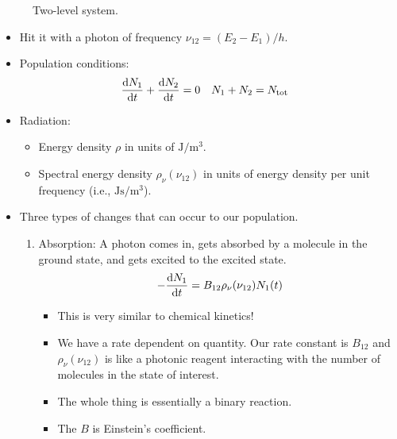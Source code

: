 \documentclass[../notes.tex]{subfiles}
\begin{document}
\begin{itemize}
\begin{figure}[h!]
        \caption{Two-level system.}
        \label{fig:2LevelSystem}
    \end{figure}
    \begin{itemize}
        \item Hit it with a photon of frequency $\nu_{12}=(E_2-E_1)/h$.
        \item Population conditions:
        \begin{align*}
            \dv{N_1}{t}+\dv{N_2}{t} &= 0&
            N_1+N_2 &= N_\text{tot}
        \end{align*}
        \item Radiation:
        \begin{itemize}
            \item Energy density $\rho$ in units of $\si{\joule\per\cubic\meter}$.
            \item Spectral energy density $\rho_\nu(\nu_{12})$ in units of energy density per unit frequency (i.e., $\si{\joule\second\per\cubic\meter}$).
        \end{itemize}
        \item Three types of changes that can occur to our population.
        \begin{enumerate}
            \item Absorption: A photon comes in, gets absorbed by a molecule in the ground state, and gets excited to the excited state.
            \begin{equation*}
                -\dv{N_1}{t} = B_{12}\rho_\nu(\nu_{12})N_1(t)
            \end{equation*}
            \begin{itemize}
                \item This is very similar to chemical kinetics!
                \item We have a rate dependent on quantity. Our rate constant is $B_{12}$ and $\rho_\nu(\nu_{12})$ is like a photonic reagent interacting with the number of molecules in the state of interest.
                \item The whole thing is essentially a binary reaction.
                \item The $B$ is Einstein's coefficient.
            \end{itemize}

\end{enumerate}
\end{itemize}
\end{itemize}
\end{document}
